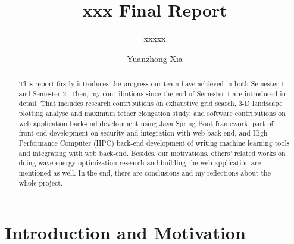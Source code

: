 \documentclass[sigconf, review=false]{acmart}
\begin{document}
\title{xxx Final Report}
\subtitle{xxxxx}

\author{Yuanzhong Xia}

\begin{abstract}
This report firstly introduces the progress our team have achieved in both Semester 1 and Semester 2.
Then, my contributions since the end of Semester 1 are introduced in detail.
That includes research contributions on exhaustive grid search, 3-D landscape plotting analyse and maximum tether elongation study,
and software contributions on web application back-end development using Java Spring Boot framework,
part of front-end development on security and integration with web back-end,
and High Performance Computer (HPC) back-end development of writing machine learning tools and integrating with web back-end.
Besides, our motivations, others' related works on doing wave energy optimization research and building the web application are mentioned as well.
In the end, there are conclusions and my reflections about the whole project.

\end{abstract}
\maketitle



\section{Introduction and Motivation}






\end{document}
